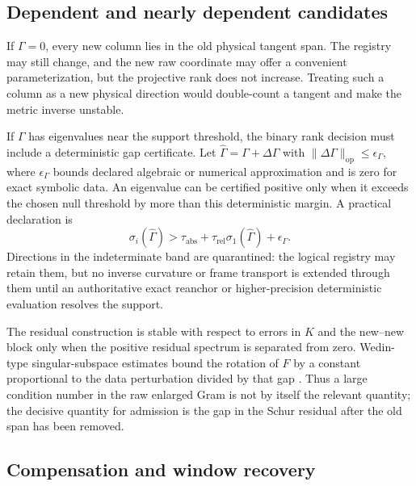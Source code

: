 \documentclass[10pt,twocolumn]{article}
\theoremstyle{definition}
\theoremstyle{remark}
\newcommand{\op}{\mathrm{op}}
\begin{document}
\subsection{Dependent and nearly dependent candidates}

If $\Gamma=0$, every new column lies in the old physical tangent span.  The
registry may still change, and the new raw coordinate may offer a convenient
parameterization, but the projective rank does not increase.  Treating such a
column as a new physical direction would double-count a tangent and make the
metric inverse unstable.

If $\Gamma$ has eigenvalues near the support threshold, the binary rank
decision must include a deterministic gap certificate.  Let
$\widehat\Gamma=\Gamma+\Delta\Gamma$ with
$\|\Delta\Gamma\|_{\op}\le\epsilon_\Gamma$, where $\epsilon_\Gamma$ bounds
declared algebraic or numerical approximation and is zero for exact symbolic
data.  An eigenvalue can be certified positive only when it exceeds the
chosen null threshold by more than this deterministic margin.  A practical declaration is
\begin{equation}
 \sigma_i(\widehat\Gamma)>\tau_{\mathrm{abs}}
 +\tau_{\mathrm{rel}}\sigma_1(\widehat\Gamma)+\epsilon_\Gamma .
 \label{eq:apprankgate}
\end{equation}
Directions in the indeterminate band are quarantined: the logical registry
may retain them, but no inverse curvature or frame transport is extended
through them until an authoritative exact reanchor or higher-precision
deterministic evaluation resolves the support.

The residual construction is stable with respect to errors in $K$ and the
new--new block only when the positive residual spectrum is separated from
zero.  Wedin-type singular-subspace estimates bound the rotation of $F$ by a
constant proportional to the data perturbation divided by that gap
\cite{Wedin1972}.  Thus a large condition number in the raw enlarged Gram is
not by itself the relevant quantity; the decisive quantity for admission is
the gap in the Schur residual after the old span has been removed.

\subsection{Compensation and window recovery}
\end{document}
